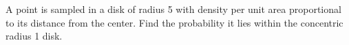 A point is sampled in a disk of radius 5 with density per unit area proportional to its distance from the center. Find the probability it lies within the concentric radius 1 disk.
